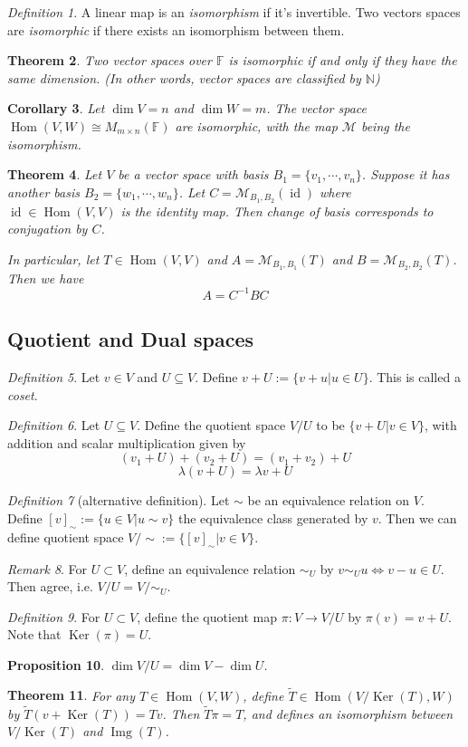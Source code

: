 \documentclass[12pt]{amsart}
\newcommand{\fff}[0]{\mathbb{F}}
\renewcommand{\ker}{\Ker}
\DeclareMathOperator{\Ker}{Ker}
\DeclareMathOperator{\Hom}{Hom}
\DeclareMathOperator{\img}{Img}
\newcommand{\calM}[0]{\mathcal{M}}
\DeclareMathOperator{\id}{id}
\newtheorem{theorem}{Theorem}[section]
\newtheorem{proposition}[theorem]{Proposition}
\newtheorem{corollary}[theorem]{Corollary}
\theoremstyle{remark}
\newtheorem{remark}[theorem]{Remark}
\newtheorem{definition}[theorem]{Definition}
\numberwithin{equation}{section}
\begin{document}
	\begin{definition}
		A linear map is an \emph{isomorphism} if it's invertible. Two vectors spaces are \emph{isomorphic} if there exists an isomorphism between them.
	\end{definition}
	\begin{theorem}
		Two vector spaces over $\fff$ is isomorphic if and only if they have the same dimension. (In other words, vector spaces are classified by $\mathbb{N}$)
	\end{theorem}
	\begin{corollary}Let $\dim V=n$ and $\dim W=m$.
		The vector space $\Hom(V,W)\cong M_{m\times n}(\fff)$ are isomorphic, with the map $\calM$  being the isomorphism.
	\end{corollary}
	\begin{theorem} Let $V$ be a vector space with basis $B_1=\{v_1,\cdots,v_n\}$. Suppose it has another basis $B_2=\{w_1,\cdots,w_n\}$. Let $C=\calM_{B_1,B_2}(\id)$ where $\id\in\Hom(V,V)$ is the identity map. Then change of basis corresponds to conjugation by $C$.
	
	In particular, let $T\in\Hom(V,V)$ and $A=\calM_{B_1,B_1}(T)$ and $B=\calM_{B_2,B_2}(T)$. Then we have
	\[A=C^{-1}BC\]
	\end{theorem}
	\subsection{Quotient and Dual spaces}
	\begin{definition}
		Let $v\in V$ and $U\subseteq V$. Define  $v+U := \{v+u|u\in U\}$. This is called a \emph{coset}.
	\end{definition}
	\begin{definition}\label{def:quotient_1}
		Let $U\subseteq V$. Define the quotient space $V/U$ to be $\{v+U|v\in V\}$, with addition and scalar multiplication given by
		\[(v_1+U)+(v_2+U) = (v_1+v_2)+U\]
		\[\lambda(v+U)=\lambda v+U\]
	\end{definition}
	\begin{definition}[alternative definition]\label{def:quotient_2} Let $\sim$ be an equivalence relation on $V$. Define $[v]_\sim:=\{u\in V|u\sim v\}$ the equivalence class generated by $v$. Then we can define quotient space $V/\sim:=\{[v]_\sim|v\in V\}$.
	\end{definition}
	\begin{remark}
		For $U\subset V$, define an equivalence relation $\sim_U$ by $v\sim_U u \iff v-u\in U$. Then  agree, i.e. $V/U = V/\sim_U$.
	\end{remark}
	\begin{definition}
		For $U\subset V$, define the quotient map $\pi: V\to V/U$ by $\pi(v)=v+U$. Note that $\ker(\pi)=U$.
	\end{definition}
	\begin{proposition}
		$\dim V/U = \dim V-\dim U$.
	\end{proposition}
	\begin{theorem}
		For any $T\in\Hom(V,W)$, define $\tilde T\in\Hom(V/\ker(T),W)$ by  $\tilde T(v+\ker(T))=Tv$. Then $\tilde T\pi = T$, and defines an isomorphism between $V/\ker(T)$ and $\img(T)$.
	\end{theorem}
	
\end{document}
